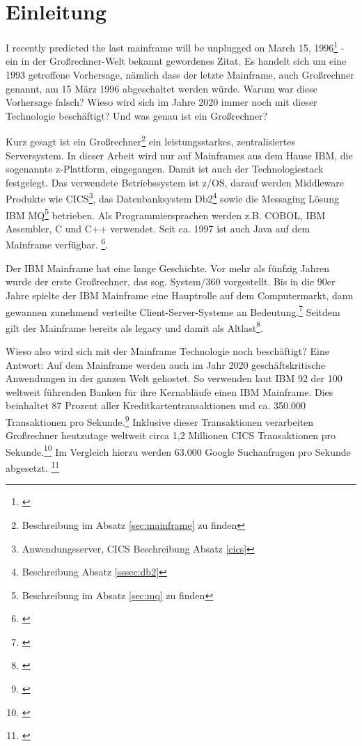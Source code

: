 \chapter{Einleitung}\label{ch:einleitung}
\glqq I recently predicted the last mainframe will be unplugged on March 15, 1996\grqq\footnote{\cite{Alsop.1993}} - ein in der Großrechner-Welt bekannt gewordenes Zitat.
Es handelt sich um eine 1993 getroffene Vorhersage, nämlich dass der letzte Mainframe, auch Großrechner genannt, am 15 März 1996 abgeschaltet werden würde.
Warum war diese Vorhersage falsch? 
Wieso wird sich im Jahre 2020 immer noch mit dieser Technologie beschäftigt? 
Und was genau ist ein Großrechner?

Kurz gesagt ist ein Großrechner\footnote{Beschreibung im Absatz \ref{sec:mainframe} zu finden} ein leistungsstarkes, zentralisiertes Serversystem.
In dieser Arbeit wird nur auf Mainframes aus dem Hause IBM, die sogenannte z-Plattform, eingegangen.
Damit ist auch der Technologiestack festgelegt.
Das verwendete Betriebssystem ist z/OS, darauf werden Middleware Produkte wie CICS\footnote{Anwendungsserver, CICS Beschreibung Absatz \ref{cics}}, das Datenbanksystem Db2\footnote{ Beschreibung Absatz \ref{sssec:db2}} sowie die Messaging Lösung \glqq IBM MQ\grqq{}\footnote{Beschreibung im Absatz \ref{sec:mq} zu finden} betrieben.
Als Programmiersprachen werden z.B. COBOL, IBM Assembler, C und C++ verwendet. 
Seit ca. 1997 ist auch Java auf dem Mainframe verfügbar. \footnote{\cite{Steegmans.2003}}.

Der IBM Mainframe hat eine lange Geschichte.
Vor mehr als fünfzig Jahren wurde der erste Großrechner, das sog. \glqq System/360\grqq{} vorgestellt.
Bis in die 90er Jahre spielte der IBM Mainframe eine Hauptrolle auf dem Computermarkt, dann gewannen zunehmend verteilte Client-Server-Systeme an Bedeutung.\footnote{\cite{Ceruzzi.2003}}
Seitdem gilt der Mainframe bereits als \glqq  legacy\grqq{} und damit als \glqq Altlast\grqq\footnote{\cite{.22.2.2020}}.

Wieso also wird sich mit der Mainframe Technologie noch beschäftigt? Eine Antwort: Auf dem Mainframe werden auch im Jahr 2020 geschäftskritische Anwendungen in der ganzen Welt gehostet.
So verwenden laut IBM 92 der 100 weltweit führenden Banken für ihre Kernabläufe einen IBM Mainframe.
Dies beinhaltet 87 Prozent aller Kreditkartentransaktionen und ca. 350.000 Transaktionen pro Sekunde.\footnote{\cite{.25.2.2020c}}
Inklusive dieser Transaktionen verarbeiten Großrechner heutzutage weltweit circa 1,2 Millionen CICS Transaktionen pro Sekunde.\footnote{\cite{.23.11.2019b}}
Im Vergleich hierzu werden 63.000 Google Suchanfragen pro Sekunde abgesetzt.  \footnote{\cite{.02.12.2019}}

